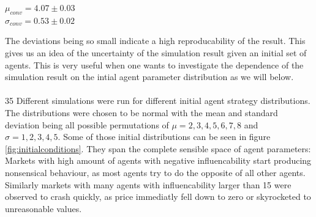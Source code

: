 \documentclass[11pt]{article}
\begin{document}
\begin{center}
  $\mu_{conv} = 4.07\pm 0.03$ \\
  $\sigma_{conv} = 0.53\pm 0.02$
\end{center}
The deviations being so small indicate a high reproducability of the result. This gives us an idea of the uncertainty of the simulation result given an initial set of agents. This is very useful when one wants to investigate the dependence of the simulation result on the intial agent parameter distribution as we will below. \\
\hfill \\
35 Different simulations were run for different initial agent strategy distributions. The distributions were chosen to be normal with the mean and standard deviation being all possible permutations of $\mu=2,3,4,5,6,7,8$ and $\sigma=1,2,3,4,5$. Some of those initial distributions can be seen in figure \ref{fig:initialconditions}. They span the complete sensible space of agent parameters: Markets with high amount of agents with negative influencability start producing nonsensical behaviour, as most agents try to do the opposite of all other agents. Similarly markets with many agents with influencability larger than 15 were observed to crash quickly, as price immediatly fell down to zero or skyrocketed to unreasonable values. \\
\end{document}
